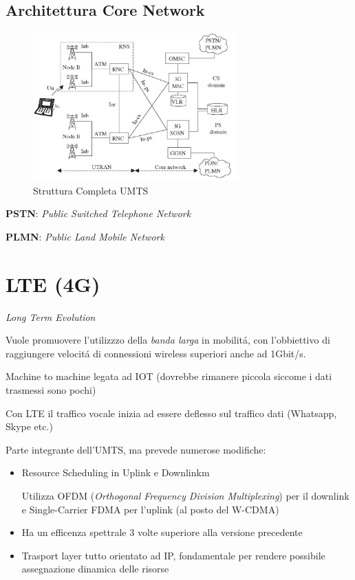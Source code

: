 \documentclass{article}
\begin{document}
\subsection{Architettura Core Network}
\begin{figure}[h]
    \includegraphics[width=0.7\textwidth]{img/sdt/umts_cn}
    \centering
    \caption{Struttura Completa UMTS}
\end{figure}

\textbf{PSTN}:  \textit{Public Switched Telephone Network}

\textbf{PLMN}: \textit{Public Land Mobile Network}

\section{LTE (4G)}
\textit{Long Term Evolution}

Vuole promuovere l'utilizzzo della \textit{banda larga} in mobilit\'a, con l'obbiettivo di raggiungere velocit\'a di connessioni wireless superiori anche ad 1Gbit/s.

Machine to machine legata ad IOT (dovrebbe rimanere piccola siccome i dati trasmessi sono pochi)

Con LTE il traffico vocale inizia ad essere deflesso sul traffico dati (Whatsapp, Skype etc.)

Parte integrante dell'UMTS, ma prevede numerose modifiche:
\begin{itemize}
    \item Resource Scheduling in Uplink e Downlinkm

        Utilizza OFDM (\textit{Orthogonal Frequency Division Multiplexing}) per il downlink e Single-Carrier FDMA per l'uplink (al posto del W-CDMA)
    \item Ha un efficenza spettrale 3 volte superiore alla versione precedente
    \item Trasport layer tutto orientato ad IP, fondamentale per rendere possibile assegnazione dinamica delle risorse
\end{itemize}
\end{document}
